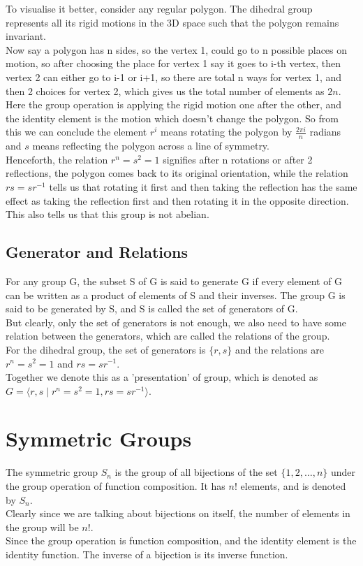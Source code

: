 \documentclass[12pt,a4paper,oneside]{report}
\theoremstyle{definition}
\begin{document}
To visualise it better, consider any regular polygon. The dihedral group represents all its rigid motions in the 3D space such that the polygon remains invariant.
\\Now say a polygon has n sides, so the vertex 1, could go to n possible places on motion, so after choosing the place for vertex 1 say it goes to i-th vertex, then vertex 2 can either go to i-1 or i+1, so there are total n ways for vertex 1, and then 2 choices for vertex 2, which gives us the total number of elements as $2n$.
\\Here the group operation is applying the rigid motion one after the other, and the identity element is the motion which doesn't change the polygon. So from this we can conclude the element $r^i$ means rotating the polygon by $\frac{2\pi i}{n}$ radians and $s$ means reflecting the polygon across a line of symmetry.
\\Henceforth, the relation $r^n=s^2=1$ signifies after n rotations or after 2 reflections, the polygon comes back to its original orientation, while the relation $rs=sr^{-1}$ tells us that rotating it first and then taking the reflection has the same effect as taking the reflection first and then rotating it in the opposite direction. This also tells us that this group is not abelian.
\subsection{Generator and Relations}
For any group G, the subset S of G is said to generate G if every element of G can be written as a product of elements of S and their inverses. The group G is said to be generated by S, and S is called the set of generators of G. 
\\But clearly, only the set of generators is not enough, we also need to have some relation between the generators, which are called the relations of the group.
\\For the dihedral group, the set of generators is $\{r,s\}$ and the relations are $r^n=s^2=1$ and $rs=sr^{-1}$.
\\Together we denote this as a 'presentation' of group, which is denoted as $G=\langle r,s \mid r^n=s^2=1, rs=sr^{-1} \rangle$.
\section{Symmetric Groups}
The symmetric group $S_n$ is the group of all bijections of the set $\{1, 2, \ldots, n\}$ under the group operation of function composition. It has $n!$ elements, and is denoted by $S_n$.
\\Clearly since we are talking about bijections on itself, the number of elements in the group will be $n!$.
\\Since the group operation is function composition, and the identity element is the identity function. The inverse of a bijection is its inverse function.
\end{document}
